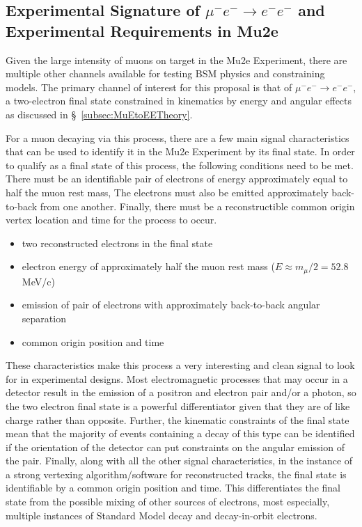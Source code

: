 \documentclass[12pt]{article}
\newcommand{\muEtoEE}{\mu^- e^- \to e^- e^-}
\begin{document}
\subsection{Experimental Signature of $\muEtoEE$ and Experimental Requirements in Mu2e} \label{subsec:SignatureMuEtoEE}

Given the large intensity of muons on target in the Mu2e Experiment, there are multiple other channels available for testing BSM physics and constraining models. The primary channel of interest for this proposal is that of $\muEtoEE$, a two-electron final state constrained in kinematics by energy and angular effects as discussed in \S~\ref{subsec:MuEtoEETheory}. 

For a muon decaying via this process, there are a few main signal characteristics that can be used to identify it in the Mu2e Experiment by its final state. In order to qualify as a final state of this process, the following conditions need to be met. There must be an identifiable pair of electrons of energy approximately equal to half the muon rest mass, The electrons must also be emitted approximately back-to-back from one another. Finally, there must be a reconstructible common origin vertex location and time for the process to occur. 
\begin{itemize}
    \item two reconstructed electrons in the final state
    \item electron energy of approximately half the muon rest mass ($E\approx m_\mu/2 = 52.8$ MeV/c)
    \item  emission of pair of electrons with approximately back-to-back angular separation
    \item common origin position and time
\end{itemize}

These characteristics make this process a very interesting and clean signal to look for in experimental designs. Most electromagnetic processes that may occur in a detector result in the emission of a positron and electron pair and/or a photon, so the two electron final state is a powerful differentiator given that they are of like charge rather than opposite. Further, the kinematic constraints of the final state mean that the majority of events containing a decay of this type can be identified if the orientation of the detector can put constraints on the angular emission of the pair. Finally, along with all the other signal characteristics, in the instance of a strong vertexing algorithm/software for reconstructed tracks, the final state is identifiable by a common origin position and time. This differentiates the final state from the possible mixing of other sources of electrons, most especially, multiple instances of Standard Model decay and decay-in-orbit electrons. 
\end{document}
